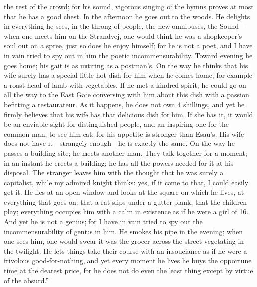 \documentclass[12pt,a4paper,openany]{book}
\newcommand{\opage}[1]{\marginnote{\footnotesize\textit{[#1]}}}
\begin{document}
the rest of the crowd; for his sound, vigorous singing of the hymns
proves at most that he has a good chest. In the afternoon he goes out to
the woods. He delights in everything he sees, in the throng of people,
the new omnibuses, the Sound---when one meets him on the Strandvej, one
would think he was a shopkeeper's soul out on a spree, just so does he
enjoy himself; for he is not a poet, and I have in vain tried to spy out
in him the poetic incommensurability. \opage{59}Toward evening he goes home; his
gait is as untiring as a postman's. On the way he thinks that his wife
surely has a special little hot dish for him when he comes home, for
example a roast head of lamb with vegetables. If he met a kindred spirit,
he could go on all the way to the East Gate conversing with him about
this dish with a passion befitting a restaurateur. As it happens, he
does not own 4 shillings, and yet he firmly believes that his wife has
that delicious dish for him. If she has it, it would be an enviable sight
for distinguished people, and an inspiring one for the common man, to see
him eat; for his appetite is stronger than Esau's. His wife does not have
it---strangely enough---he is exactly the same. On the way he passes a
building site; he meets another man. They talk together for a moment; in
an instant he erects a building; he has all the powers needed for it at
his disposal. The stranger leaves him with the thought that he was surely
a capitalist, while my admired knight thinks: yes, if it came to that, I
could easily get it. He lies at an open window and looks at the square
on which he lives, at everything that goes on: that a rat slips under a
gutter plank, that the children play; everything occupies him with a
calm in existence as if he were a girl of 16. And yet he is not a genius;
for I have in vain tried to spy out the incommensurability of genius in
him. He smokes his pipe in the evening; when one sees him, one would
swear it was the grocer across the street vegetating in the twilight. He
lets things take their course %
with an insouciance as if he were a frivolous good-for-nothing, and yet
every moment he lives he buys the \opage{60}opportune time at the dearest price,
for he does not do even the least thing except by virtue of the
absurd.''
\end{document}
